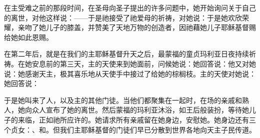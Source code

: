在主受难之前的那段时间，在圣母向圣子提出的许多问题中，她开始询问关于自己的离世，对他这样说：——于是祂接受了祂爱母的祈祷，对她说：于是她欢欣荣耀，亲吻了她儿子的膝盖，并赞美了天地万物的创造者，因祂藉她儿子耶稣基督赐给她如此恩赐。\par

在第二年后，就是在我们的主耶稣基督升天之后，最蒙福的童贞玛利亚日夜持续祈祷。在她安息前的第三天，主的天使来到她面前，问候她说：她回答说：他又对她说：她感谢天主，极其喜乐地从天使手中接过了给她的棕榈枝。主的天使对她说：她回答说：\par

于是她叫来了人，以及主的其他门徒。当他们都聚集在一起时，在场的亲戚和熟人，她向众人宣布了她的离世。然后蒙福的玛利亚沐浴，如王后般装扮，等待她儿子的来临，正如祂所应许的。她请求所有亲戚留在她身边，安慰她。她身边还有三个贞女：、和。但我们主耶稣基督的门徒们早已分散到世界各地向天主子民传道。\par

